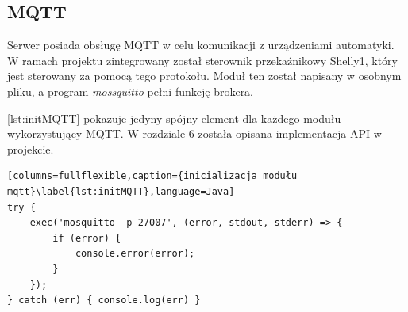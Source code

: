 \subsection{MQTT}
Serwer posiada obsługę MQTT w celu komunikacji z urządzeniami automatyki. W ramach projektu zintegrowany został sterownik przekaźnikowy Shelly1, który jest sterowany za pomocą tego protokołu. Moduł ten został napisany w osobnym pliku, a program \textit{mossquitto} pełni funkcję brokera.
\par \ref{lst:initMQTT} pokazuje jedyny spójny element dla każdego modułu wykorzystujący MQTT. W rozdziale 6 została opisana implementacja API w projekcie.

\begin{lstlisting}[columns=fullflexible,caption={inicializacja modułu mqtt}\label{lst:initMQTT},language=Java]
try {
	exec('mosquitto -p 27007', (error, stdout, stderr) => {
		if (error) {
			console.error(error);
		}
	});
} catch (err) { console.log(err) }
\end{lstlisting}
